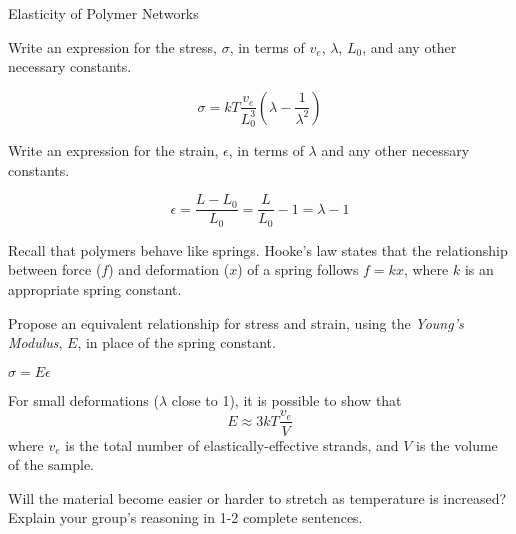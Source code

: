 \begin{activity}{Elasticity of Polymer Networks}
\begin{model}
\end{model}

\begin{ctqs}

	\question Write an expression for the stress, $\sigma$, in terms of $v_e$, $\lambda$, $L_0$, and any other necessary constants.
	
		\begin{solution}[0.8in]
			\begin{equation*}
				\sigma = kT\frac{v_e}{L_0^3}\left(\lambda - \frac{1}{\lambda^2}\right)
			\end{equation*}
		\end{solution}

	\question Write an expression for the strain, $\epsilon$, in terms of $\lambda$ and any other necessary constants.
	
		\begin{solution}[0.8in]
			\begin{equation*}
				\epsilon = \frac{L-L_0}{L_0} = \frac{L}{L_0} -1 = \lambda - 1
			\end{equation*}
		\end{solution}
		
	\question Recall that polymers behave like springs.  Hooke's law states that the relationship between force ($f$) and deformation ($x$) of a spring follows $f=kx$, where $k$ is an appropriate spring constant.
	
		Propose an equivalent relationship for stress and strain, using the \emph{Young's Modulus}, $E$, in place of the spring constant.
		
			\begin{solution}[0.5in]
			
				$\sigma = E\epsilon$
				
			\end{solution}
	
\end{ctqs}

\begin{infobox}
	For small deformations ($\lambda$ close to 1), it is possible to show that
	\begin{equation*}
		E \approx 3kT\frac{v_e}{V}
	\end{equation*}
	where $v_e$ is the total number of elastically-effective strands, and $V$ is the volume of the sample.
\end{infobox}

\begin{ctqs}
	\question Will the material become easier or harder to stretch as temperature is increased?  Explain your group's reasoning in 1-2 complete sentences.
	

\end{ctqs}
\end{activity}
